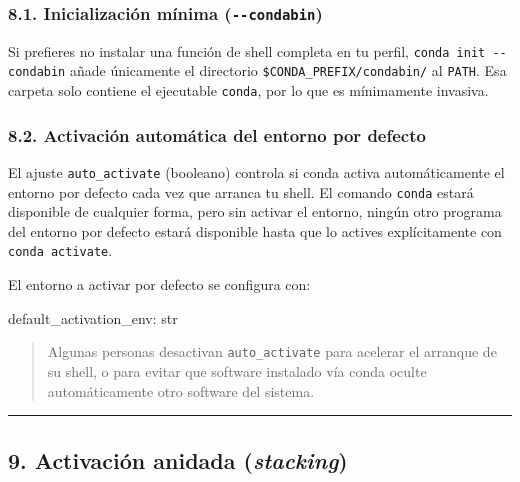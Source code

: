 \documentclass[
  doc,
  floatsintext,
  longtable,
  a4paper,
  nolmodern,
  notxfonts,
  notimes,
  12pt,
  colorlinks=true,linkcolor=blue,citecolor=blue,urlcolor=blue]{apa7}
\newenvironment{Shaded}{\begin{snugshade}}{\end{snugshade}}
\newcommand{\ExtensionTok}[1]{\textcolor[rgb]{0.00,0.23,0.31}{#1}}
\newcommand{\NormalTok}[1]{\textcolor[rgb]{0.00,0.23,0.31}{#1}}
\begin{document}
\subsubsection{\texorpdfstring{8.1. Inicialización mínima
(\texttt{-\/-condabin})}{8.1. Inicialización mínima (-\/-condabin)}}\label{inicializaciuxf3n-muxednima---condabin}

Si prefieres no instalar una función de shell completa en tu perfil,
\texttt{conda\ init\ -\/-condabin} añade únicamente el directorio
\texttt{\$CONDA\_PREFIX/condabin/} al \texttt{PATH}. Esa carpeta solo
contiene el ejecutable \texttt{conda}, por lo que es mínimamente
invasiva.

\subsubsection{8.2. Activación automática del entorno por
defecto}\label{activaciuxf3n-automuxe1tica-del-entorno-por-defecto}

El ajuste \texttt{auto\_activate} (booleano) controla si conda activa
automáticamente el entorno por defecto cada vez que arranca tu shell. El
comando \texttt{conda} estará disponible de cualquier forma, pero sin
activar el entorno, ningún otro programa del entorno por defecto estará
disponible hasta que lo actives explícitamente con
\texttt{conda\ activate}.

El entorno a activar por defecto se configura con:

\begin{Shaded}
\begin{Highlighting}[]
\ExtensionTok{default\_activation\_env:}\NormalTok{ str}
\end{Highlighting}
\end{Shaded}

\begin{quote}
Algunas personas desactivan \texttt{auto\_activate} para acelerar el
arranque de su shell, o para evitar que software instalado vía conda
oculte automáticamente otro software del sistema.
\end{quote}

\begin{center}\rule{0.5\linewidth}{0.5pt}\end{center}

\subsection{\texorpdfstring{9. Activación anidada
(\emph{stacking})}{9. Activación anidada (stacking)}}\label{activaciuxf3n-anidada-stacking}
\end{document}
